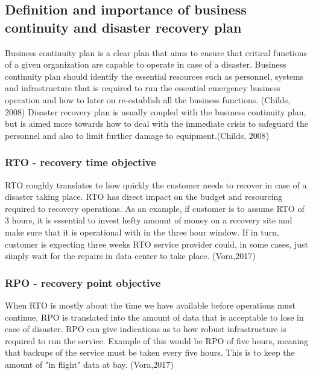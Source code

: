 \documentclass{article}
\begin{document}
\subsection{Definition and importance of business continuity and disaster recovery plan}
Business continuity plan is a clear plan that aims to ensure that critical functions of a given organization are capable to operate in case of a disaster.
Business continuity plan should identify the essential resources such as personnel, systems and infrastructure that is required to run the essential emergency business operation and how to later on re-establish all the business functions. (Childs, 2008)
Disaster recovery plan is usually coupled with the business continuity plan, but is aimed more towards how to deal with the immediate crisis to safeguard the personnel and also to limit further damage to equipment.(Childs, 2008)
\subsubsection{RTO - recovery time objective}
RTO roughly translates to how quickly the customer needs to recover in case of a disaster taking place. RTO has direct impact on the budget and resourcing required to recovery operations. As an example, if customer is to assume RTO of 3 hours, it is essential to invest hefty amount of money on a recovery site and make sure that it is operational with in the three hour window. If in turn, customer is expecting three weeks RTO service provider could, in some cases, just simply wait for the repairs in data center to take place. (Vora,2017)
\subsubsection{RPO - recovery point objective}
When RTO is mostly about the time we have available before operations must continue, RPO is translated into the amount of data that is acceptable to lose in case of disaster. RPO can give indications as to how robust infrastructure is required to run the service. Example of this would be RPO of five hours, meaning that backups of the service must be taken every five hours. This is to keep the amount of "in flight" data at bay. (Vora,2017)
\end{document}
